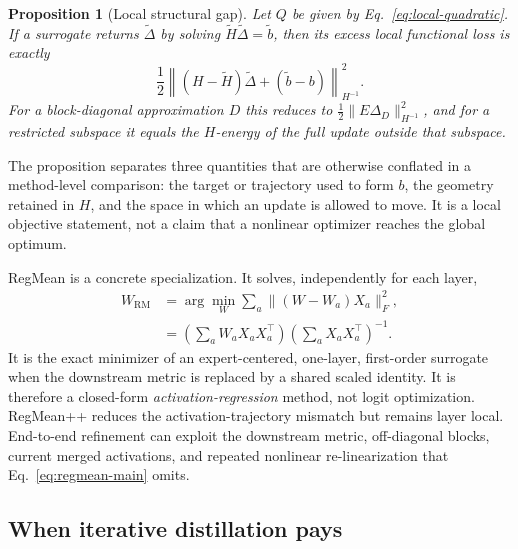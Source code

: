 \documentclass[letterpaper]{article} %
\theoremstyle{plain}
\newtheorem{proposition}[theorem]{Proposition}
\theoremstyle{definition}
\begin{document}
\begin{proposition}[Local structural gap]
\label{prop:local-gap-main}
Let $Q$ be given by Eq.~\eqref{eq:local-quadratic}. If a surrogate returns
$\widetilde\Delta$ by solving $\widetilde H\widetilde\Delta=\widetilde b$, then its
excess local functional loss is exactly
\[
\frac12\left\|(H-\widetilde H)\widetilde\Delta+(\widetilde b-b)\right\|_{H^{-1}}^2.
\]
For a block-diagonal approximation $D$ this reduces to
$\tfrac12\|E\Delta_D\|_{H^{-1}}^2$, and for a restricted subspace it equals the
$H$-energy of the full update outside that subspace.
\end{proposition}

The proposition separates three quantities that are otherwise conflated in a method-level
comparison: the target or trajectory used to form $b$, the geometry retained in $H$, and the
space in which an update is allowed to move. It is a local objective statement, not a claim
that a nonlinear optimizer reaches the global optimum.

RegMean is a concrete specialization. It solves, independently for each layer,
\begin{equation}
\begin{aligned}
W_{\mathrm{RM}}
&=\arg\min_W \sum_a\|(W-W_a)X_a\|_F^2,\\
&=\left(\sum_aW_aX_aX_a^\top\right)
  \left(\sum_aX_aX_a^\top\right)^{-1}.
\end{aligned}
\label{eq:regmean-main}
\end{equation}
It is the exact minimizer of an expert-centered, one-layer, first-order surrogate when the
downstream metric is replaced by a shared scaled identity. It is therefore a closed-form
\emph{activation-regression} method, not logit optimization. RegMean++ reduces the
activation-trajectory mismatch but remains layer local. End-to-end refinement can exploit
the downstream metric, off-diagonal blocks, current merged activations, and repeated
nonlinear re-linearization that Eq.~\eqref{eq:regmean-main} omits.

\subsection{When iterative distillation pays}
\label{sec:compute-error-main}
\end{document}
